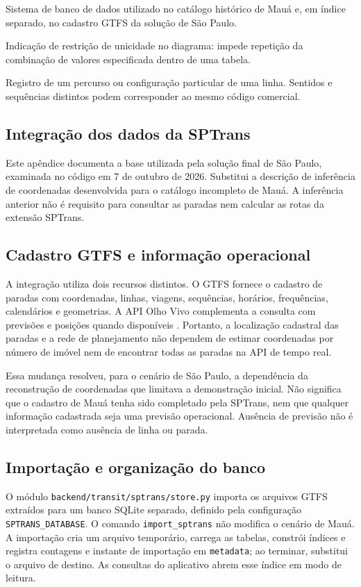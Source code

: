 \documentclass[12pt,oneside,a4paper,brazil,chapter=TITLE]{abntex2}
\let\papsection\section
\renewcommand{\section}{\clearpage\papsection}
\begin{document}
\begin{description}[style=nextline,leftmargin=0pt,labelwidth=0pt,font=\bfseries,itemsep=0.5\baselineskip]
\item[SQLite] Sistema de banco de dados utilizado no catálogo histórico de Mauá e, em índice separado, no cadastro GTFS da solução de São Paulo.
\item[UQ (Unique)] Indicação de restrição de unicidade no diagrama: impede repetição da combinação de valores especificada dentro de uma tabela.
\item[Variante de linha] Registro de um percurso ou configuração particular de uma linha. Sentidos e sequências distintos podem corresponder ao mesmo código comercial.
\end{description}

\begin{apendicesenv}
\chapter{Integração dos dados da SPTrans}
\label{ap:importacao}
Este apêndice documenta a base utilizada pela solução final de São Paulo, examinada no código em 7 de outubro de 2026. Substitui a descrição de inferência de coordenadas desenvolvida para o catálogo incompleto de Mauá. A inferência anterior não é requisito para consultar as paradas nem calcular as rotas da extensão SPTrans.

\section{Cadastro GTFS e informação operacional}
A integração utiliza dois recursos distintos. O GTFS fornece o cadastro de paradas com coordenadas, linhas, viagens, sequências, horários, frequências, calendários e geometrias. A API Olho Vivo complementa a consulta com previsões e posições quando disponíveis \citep{gtfs,sptransapi}. Portanto, a localização cadastral das paradas e a rede de planejamento não dependem de estimar coordenadas por número de imóvel nem de encontrar todas as paradas na API de tempo real.

Essa mudança resolveu, para o cenário de São Paulo, a dependência da reconstrução de coordenadas que limitava a demonstração inicial. Não significa que o cadastro de Mauá tenha sido completado pela SPTrans, nem que qualquer informação cadastrada seja uma previsão operacional. Ausência de previsão não é interpretada como ausência de linha ou parada.

\section{Importação e organização do banco}
O módulo \nolinkurl{backend/transit/sptrans/store.py} importa os arquivos GTFS extraídos para um banco SQLite separado, definido pela configuração \texttt{SPTRANS\_DATABASE}. O comando \texttt{import\_sptrans} não modifica o cenário de Mauá. A importação cria um arquivo temporário, carrega as tabelas, constrói índices e registra contagens e instante de importação em \texttt{metadata}; ao terminar, substitui o arquivo de destino. As consultas do aplicativo abrem esse índice em modo de leitura.


\end{apendicesenv}
\end{document}
